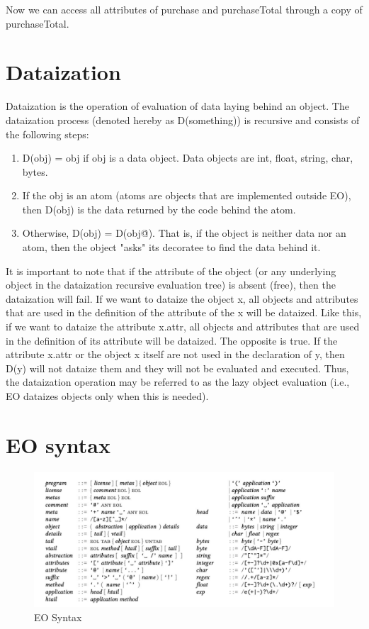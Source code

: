 \documentclass[12pt]{book}
\begin{document}
Now we can access all attributes of purchase and purchaseTotal through a copy of purchaseTotal.

\section{Dataization}
Dataization is the operation of evaluation of data laying behind an object. The dataization process (denoted hereby as D(something)) is recursive and consists of the following steps:

\begin{enumerate}
    \item D(obj) = obj if obj is a data object. Data objects are int, float, string, char, bytes.
    \item If the obj is an atom (atoms are objects that are implemented outside EO), then D(obj) is the data returned by the code behind the atom.
    \item Otherwise, D(obj) = D(obj\.@). That is, if the object is neither data nor an atom, then the object "asks" its decoratee to find the data behind it.
\end{enumerate}

It is important to note that if the \@ attribute of the object (or any underlying object in the dataization recursive evaluation tree) is absent (free), then the dataization will fail.
If we want to dataize the object x, all objects and attributes that are used in the definition of the \@ attribute of the x will be dataized. Like this, if we want to dataize the attribute x.attr, all objects and attributes that are used in the definition of its \@ attribute will be dataized.
The opposite is true. If the attribute x.attr or the object x itself are not used in the declaration of y, then D(y) will not dataize them and they will not be evaluated and executed. Thus, the dataization operation may be referred to as the lazy object evaluation (i.e., EO dataizes objects only when this is needed).


\section{EO syntax}
\begin{figure}[tb]
  \includegraphics[width=1\textwidth,]{EOsyntxax.jpg}
  \caption{EO Syntax}
  \label{fig:uml1}
\end{figure}
\end{document}
